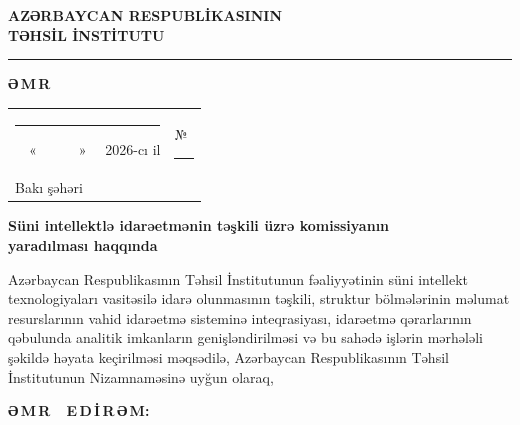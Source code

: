 \documentclass[12pt,a4paper]{article}
\newcommand{\xett}{\rule{45mm}{0.4pt}}
\begin{document}
\begin{center}
  {\large\bfseries AZƏRBAYCAN RESPUBLİKASININ}\\[2pt]
  {\large\bfseries TƏHSİL İNSTİTUTU}\\[10pt]
  \rule{\textwidth}{0.8pt}
\end{center}

\vspace{6pt}

\begin{center}
  {\Large\bfseries Ə\,M\,R}
\end{center}

\vspace{10pt}

\begin{flushleft}
\begin{tabularx}{\textwidth}{@{}Xr@{}}
  \xett\ \ «\ \ \ \ \ \ » \ \ 2026-cı il & №\ \xett \\
  Bakı şəhəri & \\
\end{tabularx}
\end{flushleft}

\vspace{14pt}

\begin{center}
  {\bfseries Süni intellektlə idarəetmənin təşkili üzrə komissiyanın\\
  yaradılması haqqında}
\end{center}

\vspace{12pt}

\justifying

Azərbaycan Respublikasının Təhsil İnstitutunun fəaliyyətinin süni intellekt
texnologiyaları vasitəsilə idarə olunmasının təşkili, struktur bölmələrinin
məlumat resurslarının vahid idarəetmə sisteminə inteqrasiyası, idarəetmə
qərarlarının qəbulunda analitik imkanların genişləndirilməsi və bu sahədə
işlərin mərhələli şəkildə həyata keçirilməsi məqsədilə, Azərbaycan
Respublikasının Təhsil İnstitutunun Nizamnaməsinə uyğun olaraq,

\vspace{8pt}
\begin{center}
  {\bfseries Ə\,M\,R\ \ E\,D\,İ\,R\,Ə\,M:}
\end{center}
\vspace{8pt}
\end{document}
